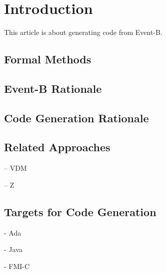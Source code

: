 \section{Introduction}
This article is about generating code from Event-B.

\subsection{Formal Methods}

\subsection{Event-B Rationale}

\subsection{Code Generation Rationale}

\subsection{Related Approaches}

-- VDM

-- Z

\subsection{Targets for Code Generation}

- Ada

- Java

- FMI-C
